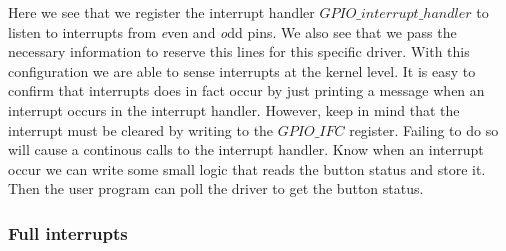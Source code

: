Here we see that we register the interrupt handler $GPIO\_interrupt\_handler$ to listen to interrupts from {\emph even} and {\emph odd} pins. We also see that we pass the necessary information to reserve this lines for this specific driver. With this configuration we are able to sense interrupts at the kernel level. It is easy to confirm that interrupts does in fact occur by just printing a message when an interrupt occurs in the interrupt handler. However, keep in mind that the interrupt must be cleared by writing to the $GPIO\_IFC$ register. Failing to do so will cause a continous calls to the interrupt handler. Know when an interrupt occur we can write some small logic that reads the button status and store it. Then the user program can poll the driver to get the button status. 


\subsubsection{Full interrupts}



